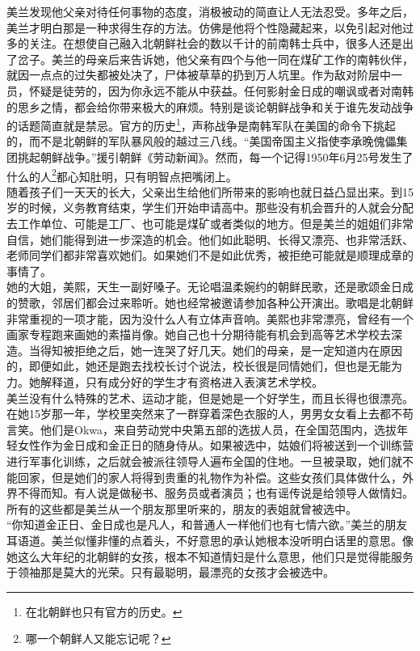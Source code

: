 \begin{multicols}{\theparacolNo}
美兰发现他父亲对待任何事物的态度，消极被动的简直让人无法忍受。多年之后，美兰才明白那是一种求得生存的方法。仿佛是他将个性隐藏起来，以免引起对他过多的关注。在想使自己融入北朝鲜社会的数以千计的前南韩士兵中，很多人还是出了岔子。美兰的母亲后来告诉她，他父亲有四个与他一同在煤矿工作的南韩伙伴，就因一点点的过失都被处决了，尸体被草草的扔到万人坑里。作为敌对阶层中一员，怀疑是徒劳的，因为你永远不能从中获益。任何影射金日成的嘲讽或者对南韩的思乡之情，都会给你带来极大的麻烦。特别是谈论朝鲜战争和关于谁先发动战争的话题简直就是禁忌。官方的历史\footnote{在北朝鲜也只有官方的历史。}，声称战争是南韩军队在美国的命令下挑起的，而不是北朝鲜的军队暴风般的越过三八线。“美国帝国主义指使李承晚傀儡集团挑起朝鲜战争。”援引朝鲜《劳动新闻》。然而，每一个记得1950年6月25号发生了什么的人\footnote{哪一个朝鲜人又能忘记呢？}都心知肚明，只有明智点把嘴闭上。\\

随着孩子们一天天的长大，父亲出生给他们所带来的影响也就日益凸显出来。到15岁的时候，义务教育结束，学生们开始申请高中。那些没有机会晋升的人就会分配去工作单位、可能是工厂、也可能是煤矿或者类似的地方。但是美兰的姐姐们非常自信，她们能得到进一步深造的机会。他们如此聪明、长得又漂亮、也非常活跃、老师同学们都非常喜欢她们。如果她们不是如此优秀，被拒绝可能就是顺理成章的事情了。\\

她的大姐，美熙，天生一副好嗓子。无论唱温柔婉约的朝鲜民歌，还是歌颂金日成的赞歌，邻居们都会过来聆听。她也经常被邀请参加各种公开演出。歌唱是北朝鲜非常重视的一项才能，因为没什么人有立体声音响。美熙也非常漂亮，曾经有一个画家专程跑来画她的素描肖像。她自己也十分期待能有机会到高等艺术学校去深造。当得知被拒绝之后，她一连哭了好几天。她们的母亲，是一定知道内在原因的，即便如此，她还是跑去找校长讨个说法，校长很是同情她们，但也是无能为力。她解释道，只有成分好的学生才有资格进入表演艺术学校。\\

美兰没有什么特殊的艺术、运动才能，但是她是一个好学生，而且长得也很漂亮。在她15岁那一年，学校里突然来了一群穿着深色衣服的人，男男女女看上去都不苟言笑。他们是Okwa，来自劳动党中央第五部的选拔人员，在全国范围内，选拔年轻女性作为金日成和金正日的随身侍从。如果被选中，姑娘们将被送到一个训练营进行军事化训练，之后就会被派往领导人遍布全国的住地。一旦被录取，她们就不能回家，但是她们的家人将得到贵重的礼物作为补偿。这些女孩们具体做什么，外界不得而知。有人说是做秘书、服务员或者演员；也有谣传说是给领导人做情妇。所有的这些都是美兰从一个朋友那里听来的，朋友的表姐就曾被选中。\\

“你知道金正日、金日成也是凡人，和普通人一样他们也有七情六欲。”美兰的朋友耳语道。美兰似懂非懂的点着头，不好意思的承认她根本没听明白话里的意思。像她这么大年纪的北朝鲜的女孩，根本不知道情妇是什么意思，他们只是觉得能服务于领袖那是莫大的光荣。只有最聪明，最漂亮的女孩才会被选中。\\


\end{multicols}
